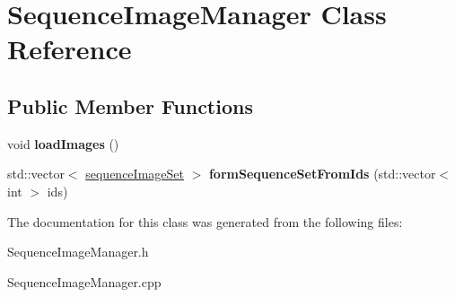 \hypertarget{class_sequence_image_manager}{\section{Sequence\+Image\+Manager Class Reference}
\label{class_sequence_image_manager}
}
\subsection*{Public Member Functions}
\begin{DoxyCompactItemize}
\item 
\hypertarget{class_sequence_image_manager_a17f2b17310200752af0b8f7ac7a7d775}{void {\bfseries load\+Images} ()}\label{class_sequence_image_manager_a17f2b17310200752af0b8f7ac7a7d775}

\item 
\hypertarget{class_sequence_image_manager_a44a93f8777f6ad8632e85a3db0850e20}{std\+::vector$<$ \hyperlink{structsequence_image_set}{sequence\+Image\+Set} $>$ {\bfseries form\+Sequence\+Set\+From\+Ids} (std\+::vector$<$ int $>$ ids)}\label{class_sequence_image_manager_a44a93f8777f6ad8632e85a3db0850e20}

\end{DoxyCompactItemize}


The documentation for this class was generated from the following files\+:\begin{DoxyCompactItemize}
\item 
Sequence\+Image\+Manager.\+h\item 
Sequence\+Image\+Manager.\+cpp\end{DoxyCompactItemize}
